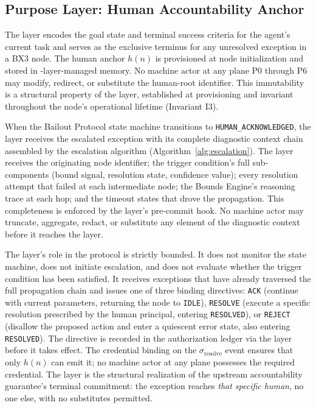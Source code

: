 \subsection{Purpose Layer: Human Accountability Anchor}
\label{sec:bailout-purpose-layer}

The \purpose{} layer encodes the goal state and terminal success criteria
for the agent's current task and serves as the exclusive terminus for any
unresolved exception in a BX3 node.  The human anchor $h(n)$ is provisioned
at node initialization and stored in \fact{}-layer-managed memory.  No
machine actor at any plane P0 through P6 may modify, redirect, or substitute
the human-root identifier.  This immutability is a structural property of the
\purpose{} layer, established at provisioning and invariant throughout the
node's operational lifetime (Invariant I3).

When the Bailout Protocol state machine transitions to
\texttt{HUMAN\_ACKNOWLEDGED}, the \purpose{} layer receives the escalated
exception with its complete diagnostic context chain assembled by the
escalation algorithm (Algorithm~\ref{alg:escalation}).  The layer receives
the originating node identifier; the trigger condition's full sub-components
(bound signal, resolution state, confidence value); every resolution attempt
that failed at each intermediate node; the Bounds Engine's reasoning trace
at each hop; and the timeout states that drove the propagation.  This
completeness is enforced by the \fact{} layer's pre-commit hook.  No machine
actor may truncate, aggregate, redact, or substitute any element of the
diagnostic context before it reaches the \purpose{} layer.

The \purpose{} layer's role in the protocol is strictly bounded.  It does not
monitor the state machine, does not initiate escalation, and does not evaluate
whether the trigger condition has been satisfied.  It receives exceptions that
have already traversed the full propagation chain and issues one of three
binding directives: \texttt{ACK} (continue with current parameters, returning
the node to \texttt{IDLE}), \texttt{RESOLVE} (execute a specific resolution
prescribed by the human principal, entering \texttt{RESOLVED}), or
\texttt{REJECT} (disallow the proposed action and enter a quiescent error
state, also entering \texttt{RESOLVED}).  The directive is recorded in the
authorization ledger via the \fact{} layer before it takes effect.  The
credential binding on the $\sigma_{\text{resolve}}$ event ensures that only
$h(n)$ can emit it; no machine actor at any plane possesses the required
credential.  The \purpose{} layer is the structural realization of the
upstream accountability guarantee's terminal commitment: the exception reaches
\emph{that specific human}, no one else, with no substitutes permitted.

